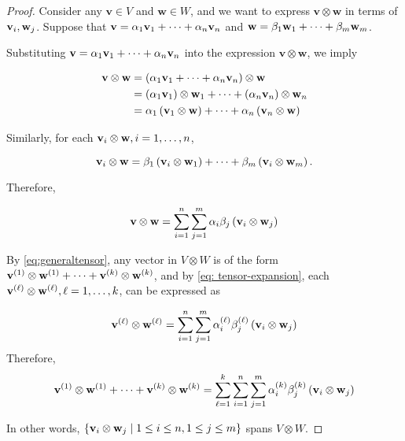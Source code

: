 \begin{proof} Consider any \(\mathbf{v} \in  V\) and \(\mathbf{w} \in  W\), and we want to express \(\mathbf{v} \otimes  \mathbf{w}\) in terms of \({\bf v}_{i},{\bf w}_{j}\). Suppose that \(\mathbf{v} = \alpha_1{\bf v}_1 + \cdots  + \alpha_n{\bf v}_n\) and \(\mathbf{w} = \beta_1{\bf w}_1 + \cdots  + \beta_{m}{\bf w}_{m}\).

Substituting \(\mathbf{v} = \alpha_1{\bf v}_1 + \cdots  + \alpha_n{\bf v}_n\) into the expression \(\mathbf{v} \otimes  \mathbf{w}\), we imply

\begin{align*}
\mathbf{v} \otimes  \mathbf{w} &= \left( {\alpha_1{\bf v}_1 + \cdots  + \alpha_n{\bf v}_n}\right)  \otimes  \mathbf{w} \\
&= \left( {\alpha_1{\bf v}_1}\right)  \otimes  {\bf w}_1 + \cdots  + \left( {\alpha_n{\bf v}_n}\right)  \otimes  {\bf w}_n \\
&= \alpha_1\left( {{\bf v}_1 \otimes  \mathbf{w}}\right)  + \cdots  + \alpha_n\left( {{\bf v}_n \otimes  \mathbf{w}}\right)
\end{align*}

Similarly, for each \({\bf v}_{i} \otimes  \mathbf{w},i = 1,\ldots ,n\),

\[
{\bf v}_{i} \otimes  \mathbf{w} = \beta_1\left( {{\bf v}_{i} \otimes  {\bf w}_1}\right)  + \cdots  + \beta_{m}\left( {{\bf v}_{i} \otimes  {\bf w}_{m}}\right) .
\]

Therefore,

\begin{equation}\label{eq: tensor-expansion}
    \mathbf{v} \otimes  \mathbf{w} = \mathop{\sum }\limits_{{i = 1}}^n\mathop{\sum }\limits_{{j = 1}}^{m}\alpha_{i}\beta_{j}\left( {{\bf v}_{i} \otimes  {\bf w}_{j}}\right)
\end{equation}



By \autoref{eq:generaltensor}, any vector in \(V \otimes  W\) is of the form
\(
{\bf v}^{\left( 1\right) } \otimes  {\bf w}^{\left( 1\right) } + \cdots  + {\bf v}^{\left( k \right) } \otimes  {\bf w}^{\left( k \right) }
\), and by \autoref{eq: tensor-expansion}, each \({\bf v}^{\left( \ell \right) } \otimes  {\bf w}^{\left( \ell \right) },\ell = 1,\ldots ,k\), can be expressed as

\[
{\bf v}^{\left( \ell\right) } \otimes  {\bf w}^{\left( \ell\right) } = \mathop{\sum }\limits_{{i = 1}}^n\mathop{\sum }\limits_{{j = 1}}^{m}\alpha_{i}^{\left( \ell\right) }\beta_{j}^{\left( \ell\right) }\left( {{\bf v}_{i} \otimes  {\bf w}_{j}}\right)
\]
Therefore,
\[
{\bf v}^{\left( 1\right) } \otimes  {\bf w}^{\left( 1\right) } + \cdots  + {\bf v}^{\left( k \right) } \otimes  {\bf w}^{\left( k \right) } = \mathop{\sum }\limits_{{\ell = 1}}^{k}\mathop{\sum }\limits_{{i = 1}}^n\mathop{\sum }\limits_{{j = 1}}^{m}\alpha_{i}^{\left( k\right) }\beta_{j}^{\left( k\right) }\left( {{\bf v}_{i} \otimes  {\bf w}_{j}}\right)
\]

In other words, \(\left\{  {{\bf v}_{i} \otimes  {\bf w}_{j} \mid  1 \leq  i \leq  n,1 \leq  j \leq  m}\right\}\) spans \(V \otimes  W\).
\end{proof}


